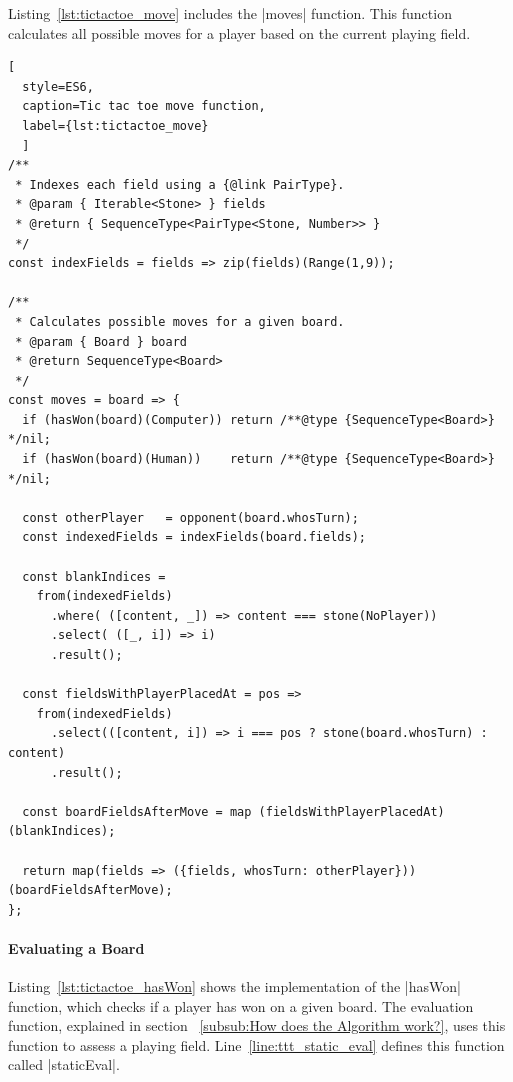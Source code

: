 Listing~\ref{lst:tictactoe_move} includes the |moves| function. This function
calculates all possible moves for a player based on the current playing field.
\begin{lstlisting}[
  style=ES6, 
  caption=Tic tac toe move function,
  label={lst:tictactoe_move}
  ]
/**
 * Indexes each field using a {@link PairType}.
 * @param { Iterable<Stone> } fields
 * @return { SequenceType<PairType<Stone, Number>> }
 */
const indexFields = fields => zip(fields)(Range(1,9));

/**
 * Calculates possible moves for a given board.
 * @param { Board } board
 * @return SequenceType<Board>
 */
const moves = board => {
  if (hasWon(board)(Computer)) return /**@type {SequenceType<Board>} */nil;
  if (hasWon(board)(Human))    return /**@type {SequenceType<Board>} */nil;

  const otherPlayer   = opponent(board.whosTurn);
  const indexedFields = indexFields(board.fields);

  const blankIndices =
    from(indexedFields)
      .where( ([content, _]) => content === stone(NoPlayer))
      .select( ([_, i]) => i)
      .result();

  const fieldsWithPlayerPlacedAt = pos =>
    from(indexedFields)
      .select(([content, i]) => i === pos ? stone(board.whosTurn) : content)
      .result();

  const boardFieldsAfterMove = map (fieldsWithPlayerPlacedAt) (blankIndices);

  return map(fields => ({fields, whosTurn: otherPlayer})) (boardFieldsAfterMove);
};
\end{lstlisting}

\paragraph{Evaluating a Board}
Listing~\ref{lst:tictactoe_hasWon} shows the implementation of the |hasWon|
function, which checks if a player has won on a given board. The evaluation
function, explained in section ~\ref{subsub:How does the Algorithm work?}, uses
this function to assess a playing field. Line~\ref{line:ttt_static_eval}
defines this function called |staticEval|.


